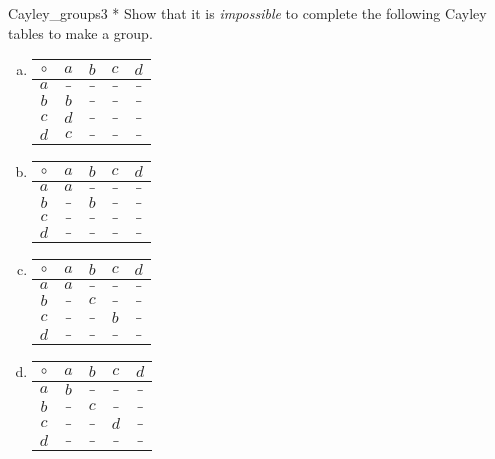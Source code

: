 \begin{exercise}{Cayley_groups3}
* Show that it is \emph{impossible} to complete the following Cayley tables to make a group.
\begin{multicols}{2}
\begin{enumerate}[(a)]

\item
\begin{center}
\begin{tabular}{c|cccc}
$\circ$ & $a$ & $b$ & $c$ & $d$ \\
\hline
$a$ & $\_$ & $\_$ & $\_$ & $\_$ \\
$b$ & $b$ & $\_$ & $\_$ & $\_$ \\
$c$ & $d$ & $\_$ & $\_$ & $\_$ \\
$d$ & $c$ & $\_$ & $\_$ & $\_$
\end{tabular}
\end{center}

\item
\begin{center}
\begin{tabular}{c|cccc}
$\circ$ & $a$ & $b$ & $c$ & $d$ \\
\hline
$a$ & $a$ & $\_$ & $\_$ & $\_$ \\
$b$ & $\_$ & $b$ & $\_$ & $\_$ \\
$c$ & $\_$ & $\_$ & $\_$ & $\_$ \\
$d$ & $\_$ & $\_$ & $\_$ & $\_$
\end{tabular}
\end{center}

\item
\begin{center}
\begin{tabular}{c|cccc}
$\circ$ & $a$ & $b$ & $c$ & $d$ \\
\hline
$a$ & $a$ & $\_$ & $\_$ & $\_$ \\
$b$ & $\_$ & $c$ & $\_$ & $\_$ \\
$c$ & $\_$ & $\_$ & $b$ & $\_$ \\
$d$ & $\_$ & $\_$ & $\_$ & $\_$
\end{tabular}
\end{center}

\item
\begin{center}
\begin{tabular}{c|cccc}
$\circ$ & $a$ & $b$ & $c$ & $d$ \\
\hline
$a$ & $b$ & $\_$ & $\_$ & $\_$ \\
$b$ & $\_$ & $c$ & $\_$ & $\_$ \\
$c$ & $\_$ & $\_$ & $d$ & $\_$ \\
$d$ & $\_$ & $\_$ & $\_$ & $\_$
\end{tabular}
\end{center}


\end{enumerate}
\end{multicols}
\end{exercise}


